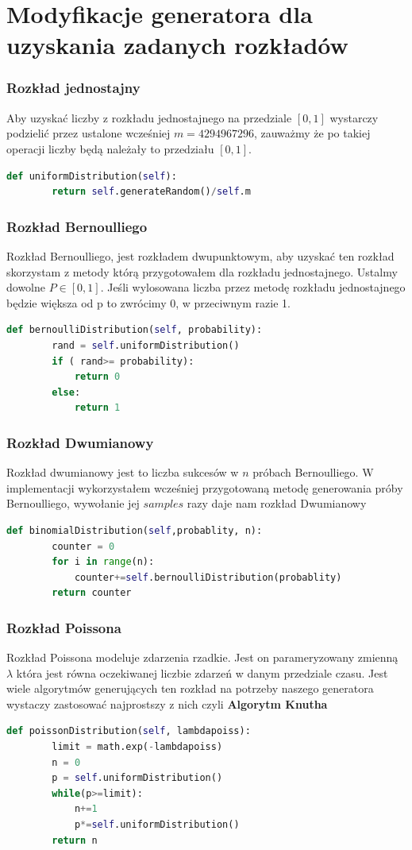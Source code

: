 \documentclass[9pt]{beamer}
\begin{document}
\section{Modyfikacje generatora dla uzyskania zadanych rozkładów}
\begin{frame}[containsverbatim]
  \frametitle{Rozkład jednostajny}
  Aby uzyskać liczby z rozkładu jednostajnego na przedziale $[0,1]$ wystarczy podzielić przez ustalone wcześniej $m=4294967296$, zauważmy że po takiej operacji liczby będą należały to przedziału $[0,1]$.
  \begin{lstlisting}[language=Python, caption=Metoda rozkładu jednostajnego]
    def uniformDistribution(self):
        return self.generateRandom()/self.m
    \end{lstlisting}
\end{frame}
\begin{frame}[containsverbatim]
  
  \frametitle{Rozkład Bernoulliego}
  Rozkład Bernoulliego, jest rozkładem dwupunktowym, aby uzyskać ten rozkład skorzystam z metody którą przygotowałem dla rozkładu jednostajnego. Ustalmy dowolne $P\in [0,1]$. Jeśli wylosowana liczba przez metodę rozkładu jednostajnego będzie większa od p to zwrócimy 0, w przeciwnym razie 1.
  \begin{lstlisting}[language=Python, caption=Metoda rozkładu Bernoulliego]
    def bernoulliDistribution(self, probability):
        rand = self.uniformDistribution()
        if ( rand>= probability):
            return 0
        else:
            return 1
    \end{lstlisting}
\end{frame}
\begin{frame}[containsverbatim]
  \frametitle{Rozkład Dwumianowy}
  Rozkład dwumianowy jest to liczba sukcesów w $n$ próbach Bernoulliego. W implementacji wykorzystałem wcześniej przygotowaną metodę generowania próby Bernoulliego, wywołanie jej $samples$ razy daje nam rozkład Dwumianowy
  \begin{lstlisting}[language=Python, caption=Metoda rozkładu Dwumianowego]
    def binomialDistribution(self,probablity, n):
        counter = 0
        for i in range(n):
            counter+=self.bernoulliDistribution(probablity)
        return counter
    \end{lstlisting}
\end{frame}
\begin{frame}[containsverbatim]
  \frametitle{Rozkład Poissona}
  Rozkład Poissona modeluje zdarzenia rzadkie. Jest on parameryzowany zmienną $\lambda$ która jest równa oczekiwanej liczbie zdarzeń w danym przedziale czasu. Jest wiele algorytmów generujących ten rozkład na potrzeby naszego generatora wystaczy zastosować najprostszy z nich czyli \textbf{ Algorytm Knutha}
  \begin{lstlisting}[language=Python, caption=Metoda rozkładu Poissona]
    def poissonDistribution(self, lambdapoiss):
        limit = math.exp(-lambdapoiss)
        n = 0
        p = self.uniformDistribution()
        while(p>=limit):
            n+=1
            p*=self.uniformDistribution()
        return n
    \end{lstlisting}
\end{frame}
\end{document}
